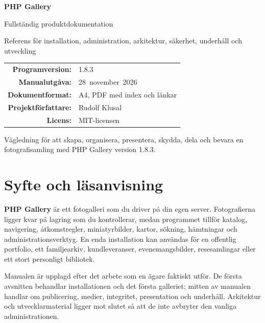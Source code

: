 \documentclass[11pt,a4paper]{article}
\newcommand{\version}{1.8.3}
\newcommand{\manualdate}{28~november~2026}
\newcommand{\product}{\textbf{PHP Gallery}}
\begin{document}
\begin{titlepage}
  \centering
  \vspace*{24mm}
  {\Huge\bfseries\color{GalleryBlue} PHP Gallery\par}
  \vspace{6mm}
  {\LARGE Fullständig produktdokumentation\par}
  \vspace{14mm}
  {\large Referens för installation, administration, arkitektur, säkerhet,
  underhåll och utveckling\par}
  \vfill
  \begin{tabular}{rl}
    \textbf{Programversion:} & \version\\
    \textbf{Manualutgåva:} & \manualdate\\
    \textbf{Dokumentformat:} & A4, PDF med index och länkar\\
    \textbf{Projektförfattare:} & Rudolf Klusal\\
    \textbf{Licens:} & MIT-licensen\\
  \end{tabular}
  \vfill
  {\small Vägledning för att skapa, organisera, presentera, skydda, dela och
  bevara en fotografisamling med PHP Gallery version \version.\par}
\end{titlepage}

\begingroup
\small
\setlength{\parskip}{0pt}
\tableofcontents
\endgroup
\clearpage
{}

\section{Syfte och läsanvisning}

\product{} är ett fotogalleri som du driver på din egen server. Fotografierna
ligger kvar på lagring som du kontrollerar, medan programmet tillför katalog,
navigering, åtkomstregler, miniatyrbilder, kartor, sökning, hämtningar och
administrationsverktyg. En enda installation kan användas för en offentlig
portfolio, ett familjearkiv, kundleveranser, evenemangsbilder, resesamlingar
eller ett stort personligt bibliotek.

Manualen är upplagd efter det arbete som en ägare faktiskt utför. De första
avsnitten behandlar installationen och det första galleriet; mitten av manualen
handlar om publicering, medier, integritet, presentation och underhåll.
Arkitektur och utvecklarmaterial ligger mot slutet så att de inte avbryter den
vanliga administrationen.
\end{document}
